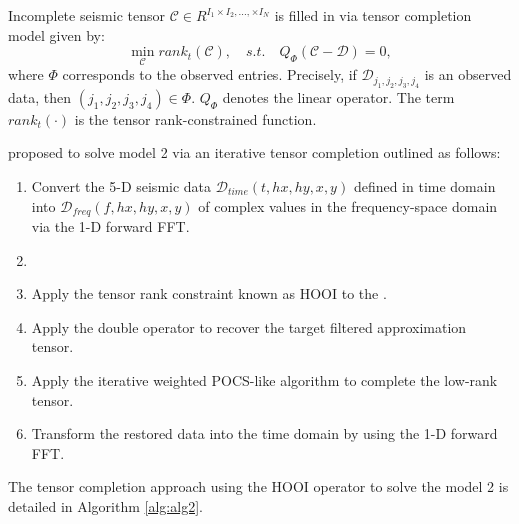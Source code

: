 Incomplete seismic tensor $\mathcal{C} \in R^{I_1 \times I_2,...,\times I_N}$ is filled in via tensor completion model given by:
\begin{equation}
\min_{\mathcal{C}}rank_t(\mathcal{C}),\quad s.t.\quad Q_\Phi(\mathcal{C}-\mathcal{D}) = 0,  
\end{equation}
where $\Phi$ corresponds to the observed entries. Precisely, if $\mathcal{D}_{j_1,j_2,j_3,j_4}$ is an observed data, then $ (j_1,j_2,j_3,j_4) \in \Phi $. $ Q_\Phi $ denotes the linear operator. The term $rank_t\left(\cdot\right)$  is the tensor rank-constrained function.

\cite{kreimer2012tensor} proposed to solve model 2 via an iterative tensor completion outlined as follows: 

\begin{enumerate}
	\item Convert the 5-D seismic data $\mathcal{D}_{time}(t, hx, hy, x, y)$ defined in time domain into $\mathcal{D}_{freq}(f, hx, hy, x, y)$ of complex values in the frequency-space domain via the 1-D forward FFT.
	\item {} 
	\item Apply the tensor rank constraint known as HOOI to the . 
	\item Apply the double operator to recover the target filtered approximation tensor.
	\item Apply the iterative weighted POCS-like algorithm to complete the low-rank tensor.
	\item Transform the restored data into the time domain by using the 1-D forward FFT.
\end{enumerate}

The tensor completion approach using the HOOI operator to solve the model 2 is detailed in Algorithm \ref{alg:alg2}.

